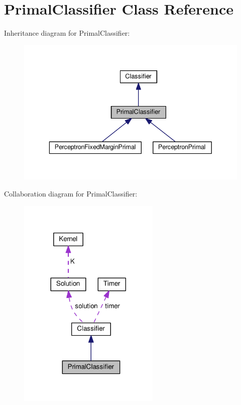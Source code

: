 \hypertarget{class_primal_classifier}{}\section{Primal\+Classifier Class Reference}
\label{class_primal_classifier}


Inheritance diagram for Primal\+Classifier\+:\nopagebreak
\begin{figure}[H]
\begin{center}
\leavevmode
\includegraphics[width=336pt]{class_primal_classifier__inherit__graph}
\end{center}
\end{figure}


Collaboration diagram for Primal\+Classifier\+:
\nopagebreak
\begin{figure}[H]
\begin{center}
\leavevmode
\includegraphics[width=192pt]{class_primal_classifier__coll__graph}
\end{center}
\end{figure}
